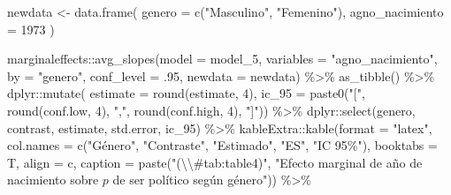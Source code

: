 \documentclass[
  12pt,
  a4paper,
]{article}
\newenvironment{Shaded}{\begin{snugshade}}{\end{snugshade}}
\newcommand{\AttributeTok}[1]{\textcolor[rgb]{0.77,0.63,0.00}{#1}}
\newcommand{\DecValTok}[1]{\textcolor[rgb]{0.00,0.00,0.81}{#1}}
\newcommand{\FunctionTok}[1]{\textcolor[rgb]{0.00,0.00,0.00}{#1}}
\newcommand{\NormalTok}[1]{#1}
\newcommand{\OtherTok}[1]{\textcolor[rgb]{0.56,0.35,0.01}{#1}}
\newcommand{\SpecialCharTok}[1]{\textcolor[rgb]{0.00,0.00,0.00}{#1}}
\newcommand{\StringTok}[1]{\textcolor[rgb]{0.31,0.60,0.02}{#1}}
\begin{document}
\begin{Shaded}
\begin{Highlighting}[]
\NormalTok{newdata }\OtherTok{\textless{}{-}} \FunctionTok{data.frame}\NormalTok{(}
  \AttributeTok{genero =} \FunctionTok{c}\NormalTok{(}\StringTok{"Masculino"}\NormalTok{, }\StringTok{"Femenino"}\NormalTok{),}
  \AttributeTok{agno\_nacimiento =} \DecValTok{1973}
\NormalTok{)}

\NormalTok{marginaleffects}\SpecialCharTok{::}\FunctionTok{avg\_slopes}\NormalTok{(}\AttributeTok{model =}\NormalTok{ model\_5, }
                            \AttributeTok{variables =} \StringTok{"agno\_nacimiento"}\NormalTok{,}
                            \AttributeTok{by =} \StringTok{"genero"}\NormalTok{,}
                            \AttributeTok{conf\_level =}\NormalTok{ .}\DecValTok{95}\NormalTok{,}
                            \AttributeTok{newdata =}\NormalTok{ newdata) }\SpecialCharTok{\%\textgreater{}\%} 
  \FunctionTok{as\_tibble}\NormalTok{() }\SpecialCharTok{\%\textgreater{}\%} 
\NormalTok{  dplyr}\SpecialCharTok{::}\FunctionTok{mutate}\NormalTok{(}
    \AttributeTok{estimate =} \FunctionTok{round}\NormalTok{(estimate, }\DecValTok{4}\NormalTok{),}
    \AttributeTok{ic\_95 =} \FunctionTok{paste0}\NormalTok{(}\StringTok{"["}\NormalTok{, }\FunctionTok{round}\NormalTok{(conf.low, }\DecValTok{4}\NormalTok{), }\StringTok{","}\NormalTok{, }
                   \FunctionTok{round}\NormalTok{(conf.high, }\DecValTok{4}\NormalTok{), }\StringTok{"]"}\NormalTok{)) }\SpecialCharTok{\%\textgreater{}\%} 
\NormalTok{  dplyr}\SpecialCharTok{::}\FunctionTok{select}\NormalTok{(genero, contrast, estimate, std.error, ic\_95) }\SpecialCharTok{\%\textgreater{}\%}
\NormalTok{  kableExtra}\SpecialCharTok{::}\FunctionTok{kable}\NormalTok{(}\AttributeTok{format =} \StringTok{"latex"}\NormalTok{, }
                    \AttributeTok{col.names =} \FunctionTok{c}\NormalTok{(}\StringTok{"Género"}\NormalTok{, }\StringTok{"Contraste"}\NormalTok{, }
                                  \StringTok{"Estimado"}\NormalTok{, }\StringTok{"ES"}\NormalTok{, }\StringTok{"IC 95\%"}\NormalTok{),}
                    \AttributeTok{booktabs =}\NormalTok{ T, }
                    \AttributeTok{align =} \StringTok{\textquotesingle{}c\textquotesingle{}}\NormalTok{,}
                    \AttributeTok{caption =} \FunctionTok{paste}\NormalTok{(}\StringTok{"(}\SpecialCharTok{\textbackslash{}\textbackslash{}}\StringTok{\#tab:table4)"}\NormalTok{,}
                                    \StringTok{"Efecto marginal de año de nacimiento sobre $p$ }
\StringTok{                                    de ser político según género"}\NormalTok{)) }\SpecialCharTok{\%\textgreater{}\%} 

\end{Highlighting}
\end{Shaded}
\end{document}
